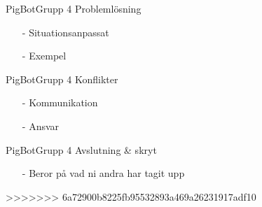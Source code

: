\begin{frame}[fragile]{PigBot}{Grupp 4}
Problemlösning
  \begin{itemize}
 \pause
    \item[-] Situationsanpassat
\pause
    \item[-] Exempel
  \end{itemize}
\end{frame}

\begin{frame}[fragile]{PigBot}{Grupp 4}
Konflikter
  \begin{itemize}
 \pause
    \item[-] Kommunikation
\pause
    \item[-] Ansvar
  \end{itemize}
\end{frame}

\begin{frame}[fragile]{PigBot}{Grupp 4}
Avslutning \& skryt
  \begin{itemize}
 \pause
    \item[-] Beror på vad ni andra har tagit upp
  \end{itemize}
\end{frame}



>>>>>>> 6a72900b8225fb95532893a469a26231917adf10






